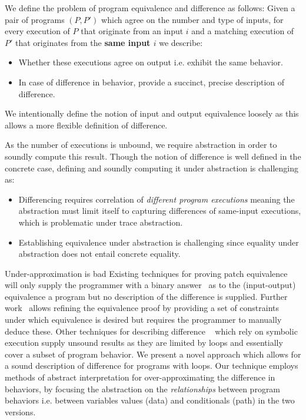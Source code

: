 We define the problem of program equivalence and difference as follows: Given a pair of programs $(P,P')$ which agree on the number and type of inputs, for every execution of $P$ that originate from an input $i$ and a matching execution of $P'$ that originates from the \textbf{same input $i$} we describe:
\begin{itemize}
\item Whether these executions agree on output i.e. exhibit the same behavior.
\item In case of difference in behavior, provide a succinct, precise description of difference.
\end{itemize}
We intentionally define the notion of input and output equivalence loosely as this allows a more flexible definition of difference.

As the number of executions is unbound, we require abstraction in order to soundly compute this result. Though the notion of difference is well defined in the concrete case, defining and soundly computing it under abstraction is challenging as:
\begin{itemize}
\item Differencing requires correlation of \emph{different program executions} meaning the abstraction must limit itself to capturing differences of same-input executions, which is problematic under trace abstraction.
\item Establishing equivalence under abstraction is challenging since equality under abstraction does not entail concrete equality.
\end{itemize}

Under-approximation is bad
Existing techniques for proving patch equivalence will only supply the
programmer with a binary answer~\cite{GodlinStrichman09} as to the
(input-output) equivalence a program but no description of the difference is
supplied. Further work~\cite{KawaguchiLahiriRebelo10} allows refining the
equivalence proof by providing a set of constraints under which equivalence
is desired but requires the programmer to manually deduce these. Other
techniques for describing difference
~\cite{DwyerElbaumPerson08,HawblitzelKawaguchiLahiriRebelo12} which rely on
symbolic execution supply unsound results as they are limited by loops and
essentially cover a subset of program behavior. We present a novel approach
which allows for a sound description of difference for programs with loops.
Our technique employs methods of abstract interpretation for
over-approximating the difference in behaviors, by focusing the abstraction
on the \emph{relationships} between program behaviors i.e. between variables
values (data) and conditionals (path) in the two versions.

